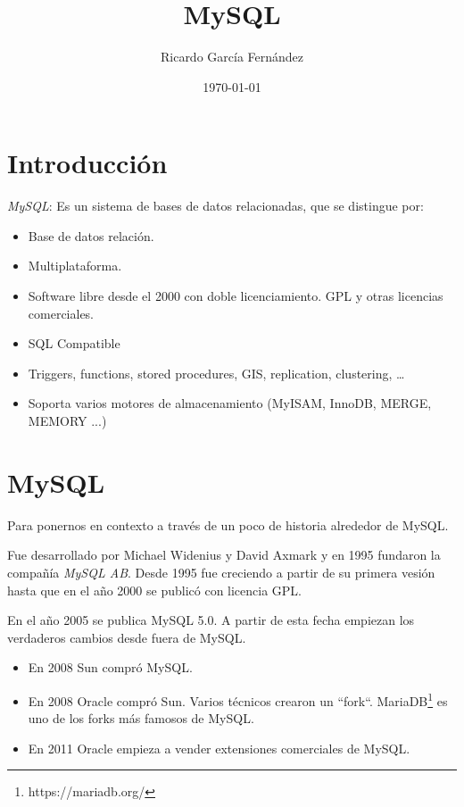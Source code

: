 \documentclass[11pt]{article}
\title{\textbf{MySQL}}
\author{Ricardo Garc\'ia Fern\'andez}
\date{\today}
\begin{document}
\maketitle

\section{Introducci\'on}

\emph{MySQL}: Es un sistema de bases de datos relacionadas, que se distingue por:

\begin{itemize}
	\item Base de datos relación.
	\item Multiplataforma.
	\item Software libre desde el 2000 con doble licenciamiento. GPL y otras licencias comerciales.
	\item SQL Compatible
	\item Triggers, functions, stored procedures, GIS, replication, clustering, \ldots
    \item Soporta varios motores de almacenamiento (MyISAM, InnoDB, MERGE, MEMORY ...)
\end{itemize}

\section{MySQL}\label{sec:mysql}

\par Para ponernos en contexto a trav\'es de un poco de historia alrededor de MySQL.

\par Fue desarrollado por Michael Widenius y David Axmark y en 1995 fundaron la compa\~n\'ia \emph{MySQL AB}. Desde 1995 fue creciendo a partir de su primera vesi\'on hasta que en el a\~no 2000 se public\'o con licencia GPL.

\par En el a\~no 2005 se publica MySQL 5.0. A partir de esta fecha empiezan los verdaderos cambios desde fuera de MySQL.

\begin{itemize}
	\item En 2008 Sun compr\'o MySQL.
	\item En 2008 Oracle compr\'o Sun. Varios t\'ecnicos crearon un ``fork``. MariaDB\footnote{https://mariadb.org/} es uno de los forks m\'as famosos de MySQL.    
	\item En 2011 Oracle empieza a vender extensiones comerciales de MySQL.
\end{itemize}
\end{document}
